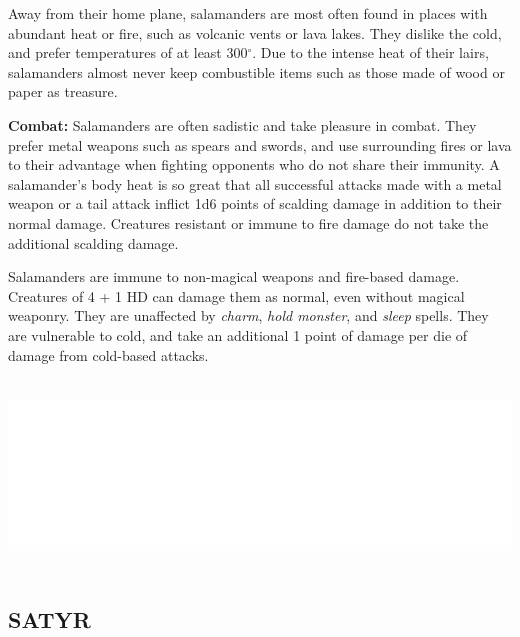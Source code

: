 \begin{multicols}{2}
Away from their home plane, salamanders are most often found in places with abundant heat or fire, such as volcanic vents or lava lakes. They dislike the cold, and prefer temperatures of at least 300$^\circ$. Due to the intense heat of their lairs, salamanders almost never keep combustible items such as those made of wood or paper as treasure.

\textbf{Combat:} Salamanders are often sadistic and take pleasure in combat. They prefer metal weapons such as spears and swords, and use surrounding fires or lava to their advantage when fighting opponents who do not share their immunity. A salamander's body heat is so great that all successful attacks made with a metal weapon or a tail attack inflict 1d6 points of scalding damage in addition to their normal damage. Creatures resistant  or immune to fire damage do not take the additional scalding damage.

Salamanders are immune to non-magical weapons and fire-based damage. Creatures of 4 + 1 HD can damage them as normal, even without magical weaponry. They are unaffected by \textit{charm}, \textit{hold monster}, and \textit{sleep} spells. They are vulnerable to cold, and take an additional 1 point of damage per die of damage from cold-based attacks.

\noindent\includegraphics[width=\columnwidth, height=2in]{testblock.pdf}


\noindent
\begin{minipage}{\columnwidth}

\vspace{1em}

\subsection{SATYR}


\end{minipage}
\end{multicols}
